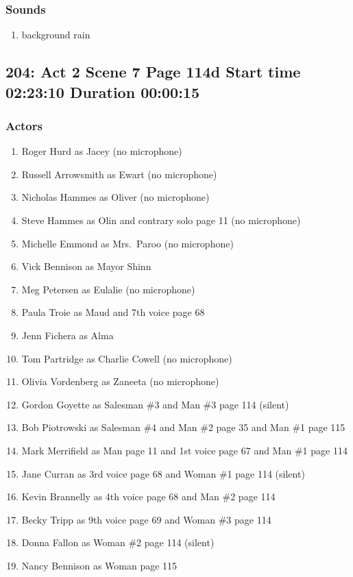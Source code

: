 \subsubsection{Sounds}
\begin{enumerate}
\item background rain
\end{enumerate}
\subsection{204: Act 2 Scene 7 Page 114d Start time 02:23:10 Duration 00:00:15}

\subsubsection{Actors}
\begin{enumerate}
\item Roger Hurd as Jacey (no microphone)
\item Russell Arrowsmith as Ewart (no microphone)
\item Nicholas Hammes as Oliver (no microphone)
\item Steve Hammes as Olin and contrary solo page 11 (no microphone)
\item Michelle Emmond as Mrs.~Paroo (no microphone)
\item Vick Bennison as Mayor Shinn
\item Meg Petersen as Eulalie (no microphone)
\item Paula Troie as Maud and 7th voice page 68
\item Jenn Fichera as Alma
\item Tom Partridge as Charlie Cowell (no microphone)
\item Olivia Vordenberg as Zaneeta (no microphone)
\item Gordon Goyette as Salesman \#3 and Man \#3 page 114 (silent)
\item Bob Piotrowski as Salesman \#4 and Man \#2 page 35 and Man \#1 page 115
\item Mark Merrifield as Man page 11 and 1st voice page 67 and Man \#1 page 114
\item Jane Curran as 3rd voice page 68 and Woman \#1 page 114 (silent)
\item Kevin Brannelly as 4th voice page 68 and Man \#2 page 114
\item Becky Tripp as 9th voice page 69 and Woman \#3 page 114
\item Donna Fallon as Woman \#2 page 114 (silent)
\item Nancy Bennison as Woman page 115
\end{enumerate}

